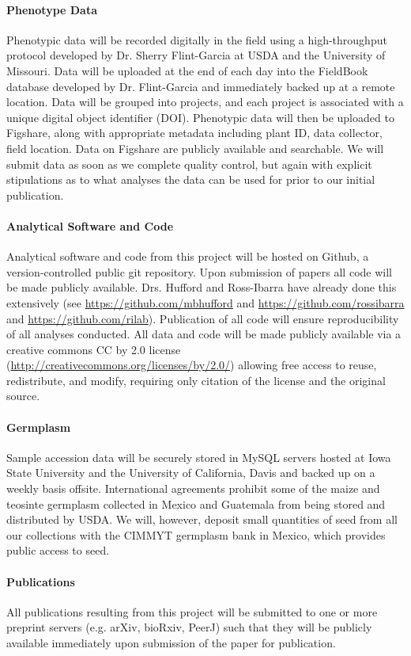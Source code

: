 \paragraph{Phenotype Data} 
Phenotypic data will be recorded digitally in the field using a high-throughput protocol developed by Dr. Sherry Flint-Garcia at USDA and the University of Missouri.  Data will be uploaded at the end of each day into the FieldBook database developed by Dr. Flint-Garcia and immediately backed up at a remote location. Data will be grouped into projects, and each project is associated with a unique digital object identifier (DOI). Phenotypic data will then be uploaded to Figshare, along with appropriate metadata including plant ID, data collector, field location. 
Data on Figshare are publicly available and searchable.  We will submit data as soon as we complete quality control, but again with explicit stipulations as to what analyses the data can be used for prior to our initial publication. 

\paragraph{Analytical Software and Code} 
Analytical software and code from this project will be hosted on Github, a version-controlled public git repository.  Upon submission of papers all code will be made publicly available.  Drs. Hufford and Ross-Ibarra have already done this extensively (see \url{https://github.com/mbhufford} and \url{https://github.com/rossibarra} and \url{https://github.com/rilab}). Publication of all code will ensure reproducibility of all analyses conducted.  All data and code will be made publicly available via a creative commons CC by 2.0 license (\url{http://creativecommons.org/licenses/by/2.0/}) allowing free access to reuse, redistribute, and modify, requiring only citation of the license and the original source.

\paragraph{Germplasm} 
Sample accession data will be securely stored in MySQL servers hosted at Iowa State University and the University of California, Davis and backed up on a weekly basis offsite.  International agreements prohibit some of the maize and teosinte germplasm collected in Mexico and Guatemala from being stored and distributed by USDA.  We will, however, deposit small quantities of seed from all our collections with the CIMMYT germplasm bank in Mexico, which provides public access to seed.

\paragraph{Publications} 
All publications resulting from this project will be submitted to one or more preprint servers (e.g. arXiv, bioRxiv, PeerJ) such that they will be publicly available immediately upon submission of the paper for publication.